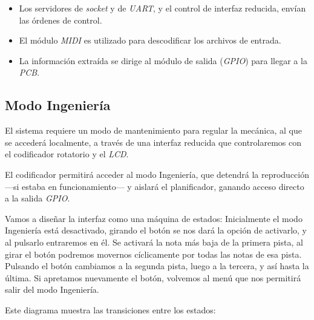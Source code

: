 \smallskip

\begin{itemize}
	\item Los servidores de \textit{socket} y de \textit{UART}, y el control de interfaz reducida, envían las órdenes de control.
	\item El módulo \textit{MIDI} es utilizado para descodificar los archivos de entrada.
	\item La información extraída se dirige al módulo de salida (\textit{GPIO}) para llegar a la \textit{PCB}.
\end{itemize}

\subsection{Modo Ingeniería}

El sistema requiere un modo de mantenimiento para regular la mecánica, al que se accederá localmente, a través de una interfaz reducida que controlaremos con el codificador rotatorio y el \textit{LCD}.

El codificador permitirá acceder al modo Ingeniería, que detendrá la reproducción ---si estaba en funcionamiento--- y  aislará el planificador, ganando acceso directo a la salida \textit{GPIO}.

Vamos a diseñar la interfaz como una máquina de estados: Inicialmente el modo Ingeniería está desactivado, girando el botón se nos dará la opción de activarlo, y al pulsarlo entraremos en él. Se activará la nota más baja de la primera pista, al girar el botón podremos movernos cíclicamente por todas las notas de esa pista. Pulsando el botón cambiamos a la segunda pista, luego a la tercera, y así hasta la última. Si apretamos nuevamente el botón, volvemos al menú que nos permitirá salir del modo Ingeniería.

Este diagrama muestra las transiciones entre los estados:

\smallskip

